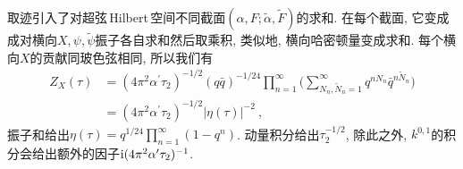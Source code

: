 取迹引入了对超弦\,Hilbert\,空间不同截面$(\alpha,F;\tilde{\alpha},\tilde{F})$的求和. 在每个截面, 它变成成对横向$ X,\psi,\tilde{\psi}$振子各自求和然后取乘积, 类似地, 横向哈密顿量变成求和. 每个横向$ X $的贡献同玻色弦相同, 所以我们有
\begin{align}
    Z_{X}(\tau)&=(4\pi^{2}\alpha^{\prime}\tau_{2})^{-1/2} (q\bar{q})^{-1/24}
    \prod_{n=1}^{\infty}\biggl(
    \sum_{N_{n},\tilde{N}_{n}=1}^{\infty}q^{n N_{n}}\bar{q}^{n\tilde{N}_{n}}\biggr) \nonumber \\
    &=(4\pi^{2}\alpha^{\prime}\tau_{2})^{-1/2} \lvert\eta(\tau)\rvert^{-2} \:,
    \label{10.7.3}
\end{align}
振子和给出$ \eta(\tau)=q^{1/24}\prod_{n=1}^{\infty}(1-q^{n})$. 动量积分给出$ \tau_{2}^{-1/2}$, 除此之外, $k^{0,1}$的积分会给出额外的因子$ \mathrm{i}(4\pi^{2}\alpha^{\prime}\tau_{2})^{-1}$.

